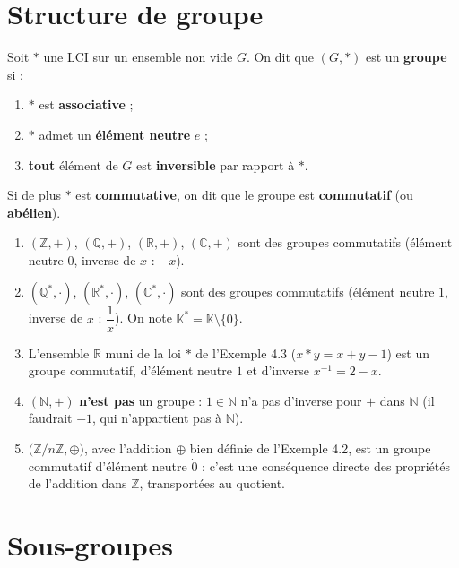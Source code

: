\documentclass[a4paper,12pt,openany]{book}
\begin{document}
\section{Structure de groupe}


\begin{definition}[4.3]
Soit $*$ une LCI sur un ensemble non vide $G$. On dit que $(G,*)$ est un
\textbf{groupe} si :
\begin{enumerate}
  \item $*$ est \textbf{associative} ;
  \item $*$ admet un \textbf{élément neutre} $e$ ;
  \item \textbf{tout} élément de $G$ est \textbf{inversible} par rapport à
  $*$.
\end{enumerate}
Si de plus $*$ est \textbf{commutative}, on dit que le groupe est
\textbf{commutatif} (ou \textbf{abélien}).
\end{definition}

\begin{exemple}[4.4]
\begin{enumerate}
  \item $(\mathbb{Z},+)$, $(\mathbb{Q},+)$, $(\mathbb{R},+)$,
  $(\mathbb{C},+)$ sont des groupes commutatifs (élément neutre $0$,
  inverse de $x$ : $-x$).
  \item $(\mathbb{Q}^*,\cdot)$, $(\mathbb{R}^*,\cdot)$,
  $(\mathbb{C}^*,\cdot)$ sont des groupes commutatifs (élément neutre $1$,
  inverse de $x$ : $\dfrac{1}{x}$). On note $\mathbb{K}^*=\mathbb{K}
  \setminus\{0\}$.
  \item L'ensemble $\mathbb{R}$ muni de la loi $*$ de l'Exemple 4.3
  ($x*y=x+y-1$) est un groupe commutatif, d'élément neutre $1$ et
  d'inverse $x^{-1}=2-x$.
  \item $(\mathbb{N},+)$ \textbf{n'est pas} un groupe : $1\in\mathbb{N}$
  n'a pas d'inverse pour $+$ dans $\mathbb{N}$ (il faudrait $-1$, qui
  n'appartient pas à $\mathbb{N}$).
  \item $\big(\mathbb{Z}/n\mathbb{Z}, \oplus\big)$, avec l'addition
  $\oplus$ bien définie de l'Exemple 4.2, est un groupe commutatif
  d'élément neutre $\dot 0$ : c'est une conséquence directe des propriétés
  de l'addition dans $\mathbb{Z}$, transportées au quotient.
\end{enumerate}
\end{exemple}


\section{Sous-groupes}
\end{document}
